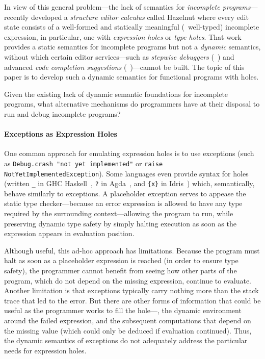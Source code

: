 In view of this general problem---the lack of semantics for \emph{incomplete
programs}---\citet{popl-paper} recently developed a \emph{structure editor
calculus} called Hazelnut where every edit state consists of a well-formed and
statically meaningful (\ie{}~well-typed) incomplete expression, in particular,
one with \emph{expression holes} or \emph{type holes}.
%
That work provides a static semantics for incomplete programs but not a
\emph{dynamic} semantics, without which certain editor services---such as
\emph{stepwise debuggers} (\eg{}~\cite{XXX}) and advanced \emph{code completion
suggestions} (\eg{}~\cite{XXX})---cannot be built.
%
The topic of this paper is to develop such a dynamic semantics for functional
programs with holes.


Given the existing lack of dynamic semantic foundations for incomplete programs,
what alternative mechanisms do programmers have at their disposal to run and
debug incomplete programs?

\paragraph{Exceptions as Expression Holes}
%
One common approach for emulating expression holes is to use exceptions (such as
\verb+Debug.crash "not yet implemented"+ or \verb+raise NotYetImplementedException+).
%
Some languages even provide syntax for holes
%
(written \verb+_+ in GHC Haskell~\cite{XXX},
\verb+?+ in Agda~\cite{XXX}, and
\verb+{x}+ in Idris~\cite{XXX})
%
which, semantically, behave similarly to exceptions.
%
A placeholder exception serves to appease the static type checker---because an
error expression is allowed to have any type required by the surrounding
context---allowing the program to run, while preserving dynamic type safety by
simply halting execution as soon as the expression appears in evaluation
position.

Although useful, this ad-hoc approach has limitations.
%
Because the program must halt as soon as a placeholder expression is reached (in
order to ensure type safety), the programmer cannot benefit from seeing how
other parts of the program, which do not depend on the missing expression,
continue to evaluate.
%
Another limitation is that exceptions typically carry nothing more than the
stack trace that led to the error.
%
But there are other forms of information that could be useful as the programmer
works to fill the hole---\eg{}, the dynamic environment around the failed
expression, and the subsequent computations that depend on the missing value
(which could only be deduced if evaluation continued).
%
Thus, the dynamic semantics of exceptions do not adequately address the
particular needs for expression holes.

